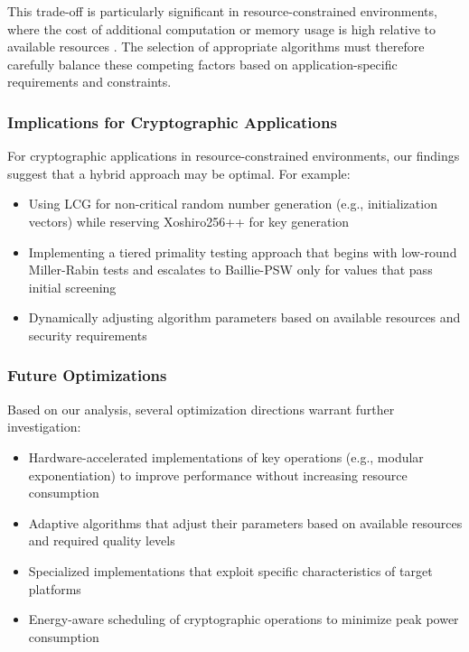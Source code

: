 This trade-off is particularly significant in resource-constrained environments, where the cost of additional computation or memory usage is high relative to available resources \cite{resource_constrained}. The selection of appropriate algorithms must therefore carefully balance these competing factors based on application-specific requirements and constraints.

\subsubsection{Implications for Cryptographic Applications}
For cryptographic applications in resource-constrained environments, our findings suggest that a hybrid approach may be optimal. For example:

\begin{itemize}
    \item Using LCG for non-critical random number generation (e.g., initialization vectors) while reserving Xoshiro256++ for key generation
    \item Implementing a tiered primality testing approach that begins with low-round Miller-Rabin tests and escalates to Baillie-PSW only for values that pass initial screening
    \item Dynamically adjusting algorithm parameters based on available resources and security requirements \cite{energy_efficient}
\end{itemize}

\subsubsection{Future Optimizations}
Based on our analysis, several optimization directions warrant further investigation:

\begin{itemize}
    \item Hardware-accelerated implementations of key operations (e.g., modular exponentiation) to improve performance without increasing resource consumption
    \item Adaptive algorithms that adjust their parameters based on available resources and required quality levels
    \item Specialized implementations that exploit specific characteristics of target platforms \cite{embedded_benchmarking}
    \item Energy-aware scheduling of cryptographic operations to minimize peak power consumption \cite{energy_efficient}
\end{itemize}

